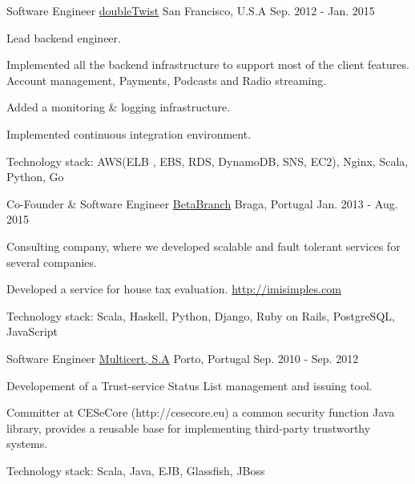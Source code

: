 \begin{cventries}
  \cventry
    {Software Engineer} %
    {\href{https://www.doubletwist.com}{doubleTwist}} %
    {San Francisco, U.S.A} %
    {Sep. 2012 - Jan. 2015} %
    {
      \begin{cvitems} %
        \item {Lead backend engineer.}
        \item {Implemented all the backend infrastructure to support most of the client features. Account management, Payments, Podcasts and Radio streaming.}
        \item {Added a monitoring \& logging infrastructure.}
        \item {Implemented continuous integration environment.}
        \item {Technology stack: AWS(ELB , EBS, RDS, DynamoDB, SNS, EC2), Nginx, Scala, Python, Go}
      \end{cvitems}
    }

  \cventry
    {Co-Founder \& Software Engineer} %
    {\href{http://betabranch.com}{BetaBranch}} %
    {Braga, Portugal} %
    {Jan. 2013 - Aug. 2015} %
    {
      \begin{cvitems} %
        \item {Consulting company, where we developed scalable and fault tolerant services for several companies.}
        \item {Developed a service for house tax evaluation. \url{http://imisimples.com}}
        \item {Technology stack: Scala, Haskell, Python, Django, Ruby on Rails, PostgreSQL, JavaScript}
      \end{cvitems}
    }

  \cventry
    {Software Engineer} %
    {\href{https://multicert.com}{Multicert, S.A}} %
    {Porto, Portugal} %
    {Sep. 2010 - Sep. 2012} %
    {
      \begin{cvitems} %
        \item {Developement of a Trust-service Status List management and issuing tool.}
        \item {Committer at CESeCore (http://cesecore.eu) a common security function Java library, provides a reusable base for implementing third-party trustworthy systems.}
        \item {Technology stack: Scala, Java, EJB, Glassfish, JBoss}
      \end{cvitems}
    }


\end{cventries}
